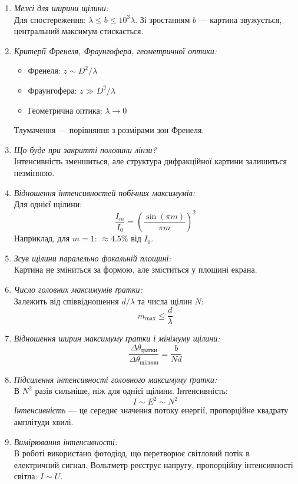\documentclass[12pt,a4paper]{article}
\begin{document}
\begin{enumerate}
  \item \textit{Межі для ширини щілини:} \\
  Для спостереження: \( \lambda \leq b \leq 10^3\lambda \). Зі зростанням $b$ — картина звужується, центральний максимум стискається.

  \item \textit{Критерії Френеля, Фраунгофера, геометричної оптики:} \\
  \begin{itemize}
    \item Френеля: $z \sim D^2/\lambda$
    \item Фраунгофера: $z \gg D^2/\lambda$
    \item Геометрична оптика: $\lambda \rightarrow 0$
  \end{itemize}
  Тлумачення — порівняння з розмірами зон Френеля.

  \item \textit{Що буде при закритті половини лінзи?} \\
  Інтенсивність зменшиться, але структура дифракційної картини залишиться незмінною.

  \item \textit{Відношення інтенсивностей побічних максимумів:} \\
  Для однієї щілини:
  \[
    \frac{I_m}{I_0} = \left( \frac{\sin(\pi m)}{\pi m} \right)^2
  \]
  Наприклад, для $m = 1$: $\approx 4.5\%$ від $I_0$.

  \item \textit{Зсув щілини паралельно фокальній площині:} \\
  Картина не зміниться за формою, але зміститься у площині екрана.

  \item \textit{Число головних максимумів ґратки:} \\
  Залежить від співвідношення $d/\lambda$ та числа щілин $N$:
  \[
    m_{\text{max}} \leq \frac{d}{\lambda}
  \]

  \item \textit{Відношення ширин максимуму ґратки і мінімуму щілини:} \\
  \[
    \frac{\Delta\theta_{\text{ґратки}}}{\Delta\theta_{\text{щілини}}} = \frac{b}{Nd}
  \]

  \item \textit{Підсилення інтенсивності головного максимуму ґратки:} \\
  В $N^2$ разів сильніше, ніж для однієї щілини. Інтенсивність:
  \[
    I \sim E^2 \sim N^2
  \]
  \textit{Інтенсивність} — це середнє значення потоку енергії, пропорційне квадрату амплітуди хвилі.

  \item \textit{Вимірювання інтенсивності:} \\
  В роботі використано фотодіод, що перетворює світловий потік в електричний сигнал. Вольтметр реєструє напругу, пропорційну інтенсивності світла: $I \sim U$.
\end{enumerate}
\end{document}
